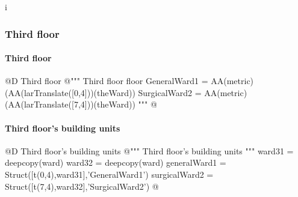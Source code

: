 i\documentclass[11pt,oneside]{article}    %
\begin{document}
\subsubsection{Third floor}
\paragraph{Third floor}
@D Third floor
@{""" Third floor floor 
GeneralWard1 = AA(metric)(AA(larTranslate([0,4]))(theWard))
SurgicalWard2 = AA(metric)(AA(larTranslate([7,4]))(theWard)) """
@}


\paragraph{Third floor's building units}
@D Third floor's building units 
@{""" Third floor's building units """
ward31 = deepcopy(ward)
ward32 = deepcopy(ward)
generalWard1 = Struct([t(0,4),ward31],'GeneralWard1')
surgicalWard2 = Struct([t(7,4),ward32],'SurgicalWard2')
@}
\end{document}
